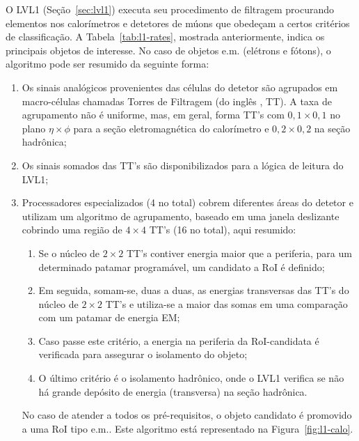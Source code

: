 O LVL1 (Seção~\ref{sec:lvl1}) executa seu procedimento de filtragem procurando
elementos nos calorímetros e detetores de múons que obedeçam a certos
critérios de classificação. A Tabela~\ref{tab:l1-rates}, mostrada
anteriormente, indica os principais objetos de interesse. No caso de objetos
e.m. (elétrons e fótons), o algoritmo pode ser resumido da seguinte forma:

\begin{enumerate}
\item Os sinais analógicos provenientes das células do detetor são agrupados
em macro-células chamadas Torres de Filtragem (do inglês ,
TT). A taxa de agrupamento não é uniforme, mas, em geral, forma TT's com
$0,1\times0,1$ no plano $\eta\times\phi$ para a seção eletromagnética do
calorímetro e $0,2\times0,2$ na seção hadrônica;

\item Os sinais somados das TT's são disponibilizados para a
lógica de leitura do LVL1;

\item Processadores especializados (4 no total) cobrem diferentes áreas do
detetor e utilizam um algoritmo de agrupamento, baseado em uma janela
deslizante \cite{l1-tdr} cobrindo uma região de $4\times4$ TT's (16 no
total), aqui resumido:

\begin{enumerate}
\item Se o núcleo de $2\times2$ TT's contiver energia maior que a
periferia, para um determinado patamar programável, um candidato a RoI é
definido;

\item Em seguida, somam-se, duas a duas, as energias transversas das TT's do
núcleo de $2\times2$ TT's e utiliza-se a maior das somas em uma comparação com
um patamar de energia EM;

\item Caso passe este critério, a energia na periferia da RoI-candidata é
verificada para assegurar o isolamento do objeto; 

\item O último critério é o isolamento hadrônico, onde o LVL1 verifica se não
há grande depósito de energia (transversa) na seção hadrônica.
\end{enumerate}  

No caso de atender a todos os pré-requisitos, o objeto candidato é promovido a
uma RoI tipo e.m.. Este algoritmo está representado na
Figura~\ref{fig:l1-calo}.
\end{enumerate}

